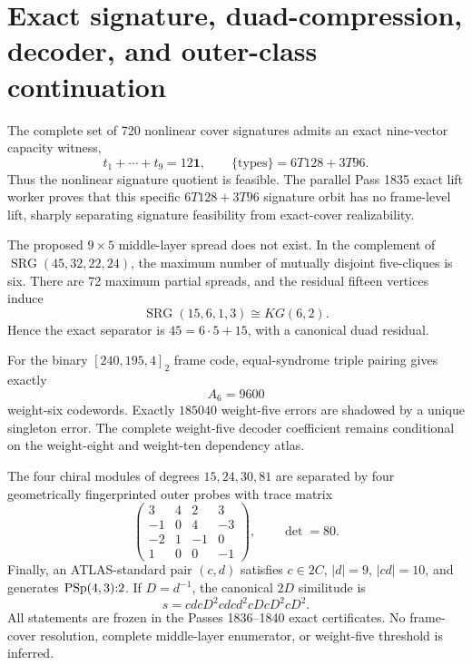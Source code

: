 \makeatletter
{}
\makeatother
\section*{Exact signature, duad-compression, decoder, and outer-class continuation}
The complete set of 720 nonlinear cover signatures admits an exact nine-vector capacity witness,
\[
 t_1+\cdots+t_9=12\mathbf 1,
 \qquad
 \{\text{types}\}=6T128+3T96.
\]
Thus the nonlinear signature quotient is feasible.  The parallel Pass 1835 exact lift worker proves that this specific $6T128+3T96$ signature orbit has no frame-level lift, sharply separating signature feasibility from exact-cover realizability.

The proposed $9\times5$ middle-layer spread does not exist.  In the complement of $\operatorname{SRG}(45,32,22,24)$, the maximum number of mutually disjoint five-cliques is six.  There are 72 maximum partial spreads, and the residual fifteen vertices induce
\[
 \operatorname{SRG}(15,6,1,3)\cong KG(6,2).
\]
Hence the exact separator is $45=6\cdot5+15$, with a canonical duad residual.

For the binary $[240,195,4]_2$ frame code, equal-syndrome triple pairing gives exactly
\[
 A_6=9600
\]
weight-six codewords.  Exactly $185040$ weight-five errors are shadowed by a unique singleton error.  The complete weight-five decoder coefficient remains conditional on the weight-eight and weight-ten dependency atlas.

The four chiral modules of degrees $15,24,30,81$ are separated by four geometrically fingerprinted outer probes with trace matrix
\[
\begin{pmatrix}
3&4&2&3\\
-1&0&4&-3\\
-2&1&-1&0\\
1&0&0&-1
\end{pmatrix},
\qquad \det=80.
\]
Finally, an ATLAS-standard pair $(c,d)$ satisfies $c\in2C$, $|d|=9$, $|cd|=10$, and generates $\operatorname{PSp}(4,3){:}2$.  If $D=d^{-1}$, the canonical $2D$ similitude is
\[
 s=c d c D^2 c d c d^2 c D c D^2 c D^2.
\]
All statements are frozen in the Passes 1836--1840 exact certificates.  No frame-cover resolution, complete middle-layer enumerator, or weight-five threshold is inferred.
